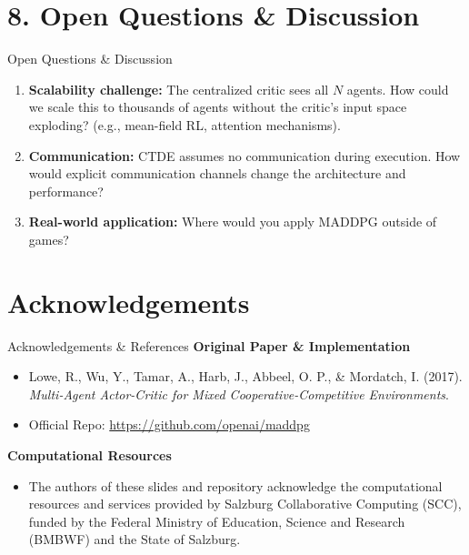 \documentclass[aspectratio=169]{beamer}
\begin{document}
\section{8. Open Questions \& Discussion}

\begin{frame}{Open Questions \& Discussion}
    \begin{enumerate}
        \item \textbf{Scalability challenge:} The centralized critic sees all $N$ agents. How could we scale this to thousands of agents without the critic's input space exploding? (e.g., mean-field RL, attention mechanisms).
        \item \textbf{Communication:} CTDE assumes no communication during execution. How would explicit communication channels change the architecture and performance?
        \item \textbf{Real-world application:} Where would you apply MADDPG outside of games?
    \end{enumerate}
\end{frame}

\section{Acknowledgements}

\begin{frame}{Acknowledgements \& References}
    \textbf{Original Paper \& Implementation}
    \begin{itemize}
        \item Lowe, R., Wu, Y., Tamar, A., Harb, J., Abbeel, O. P., \& Mordatch, I. (2017). \textit{Multi-Agent Actor-Critic for Mixed Cooperative-Competitive Environments}.
        \item Official Repo: \url{https://github.com/openai/maddpg}
    \end{itemize}
    \vspace{0.5cm}
    \textbf{Computational Resources}
    \begin{itemize}
        \item The authors of these slides and repository acknowledge the computational resources and services provided by Salzburg Collaborative Computing (SCC), funded by the Federal Ministry of Education, Science and Research (BMBWF) and the State of Salzburg.
    \end{itemize}
\end{frame}
\end{document}
